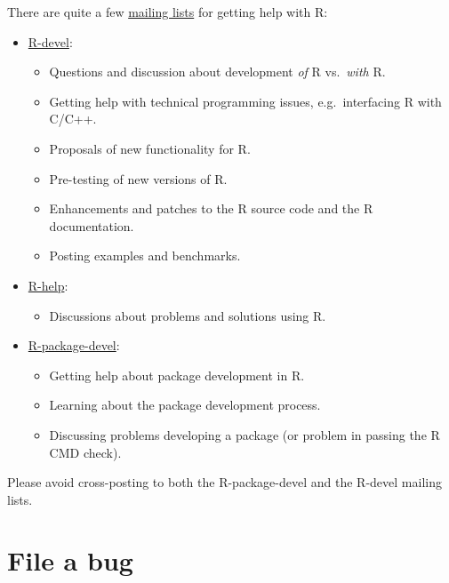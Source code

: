 \documentclass[
]{book}
\providecommand{\tightlist}{%
  \setlength{\itemsep}{0pt}\setlength{\parskip}{0pt}}
\begin{document}
There are quite a few \href{https://www.r-project.org/mail.html}{mailing lists} for getting help with R:

\begin{itemize}
\tightlist
\item
  \href{https://stat.ethz.ch/mailman/listinfo/r-devel}{R-devel}:

  \begin{itemize}
  \tightlist
  \item
    Questions and discussion about development \emph{of} R vs.~\emph{with} R.
  \item
    Getting help with technical programming issues, e.g.~interfacing R with C/C++.
  \item
    Proposals of new functionality for R.
  \item
    Pre-testing of new versions of R.
  \item
    Enhancements and patches to the R source code and the R documentation.
  \item
    Posting examples and benchmarks.
  \end{itemize}
\item
  \href{https://stat.ethz.ch/mailman/listinfo/r-help}{R-help}:

  \begin{itemize}
  \tightlist
  \item
    Discussions about problems and solutions using R.
  \end{itemize}
\item
  \href{https://stat.ethz.ch/mailman/listinfo/r-package-devel}{R-package-devel}:

  \begin{itemize}
  \tightlist
  \item
    Getting help about package development in R.
  \item
    Learning about the package development process.
  \item
    Discussing problems developing a package (or problem in passing the R CMD check).
  \end{itemize}
\end{itemize}

Please avoid cross-posting to both the R-package-devel and the R-devel mailing lists.

\hypertarget{file-a-bug}{%
\section{File a bug}\label{file-a-bug}}
\end{document}
